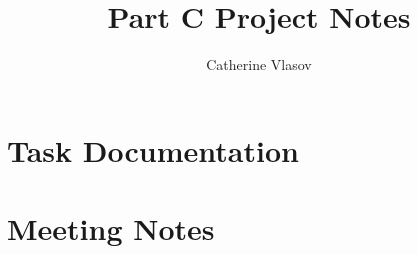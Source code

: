\documentclass[11pt,a4paper]{report}
\begin{document}
\title{Part C Project Notes}
\author{Catherine Vlasov}
\maketitle

\tableofcontents


\chapter{Task Documentation}


\chapter{Meeting Notes}
\end{document}
